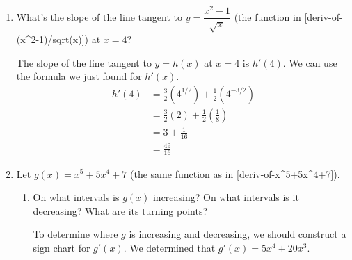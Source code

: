 \documentclass{article}
\begin{document}
\begin{enumerate}[resume]
\begin{enumerate}
  \end{enumerate}

  \pspace{\newpage}

\item 


  \begin{problem}[0.75in]
    What's the slope of the line tangent to $y = \dfrac{x^2 - 1}{\sqrt{x}}$ (the function in \ref{deriv-of-(x^2-1)/sqrt(x)}) at $x = 4$? 
  \end{problem}

  \begin{solution}
    The slope of the line tangent to $y=h(x)$ at $x=4$ is $h'(4)$. We can use the
    formula we just found for $h'(x)$.
    \begin{align*}
      h'(4) &= \tfrac{3}{2} (4^{1/2}) + \tfrac{1}{2}(4^{-3/2}) \\
      &= \tfrac{3}{2} (2) + \tfrac{1}{2}(\tfrac{1}{8}) \\
      &= 3 + \tfrac{1}{16} \\
      &= \tfrac{49}{16}
    \end{align*}
  \end{solution}

\item  Let $g(x) = x^5 + 5x^4 + 7$ (the same function as in \ref{deriv-of-x^5+5x^4+7}). 

  \begin{enumerate}

  \item
    \begin{problem}[\vfill]
      On what intervals is $g(x)$ increasing?  On what intervals is it
      decreasing? What are its turning points? 
    \end{problem}

    \begin{solution}
      To determine where $g$ is increasing and decreasing, we should construct a 
      sign chart for $g'(x)$. We determined that $g'(x) = 5x^4 + 20x^3$. 
      

\end{solution}
\end{enumerate}
\end{enumerate}
\end{document}
